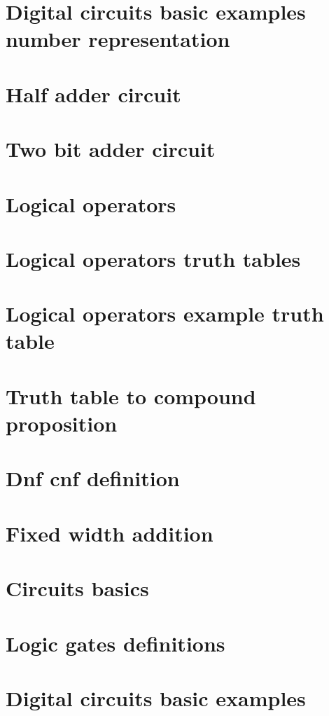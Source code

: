 
\section*{Digital circuits basic examples number representation}

\vfill
\section*{Half adder circuit}

\vfill
\section*{Two bit adder circuit}

\vfill
\section*{Logical operators}

\vfill
\section*{Logical operators truth tables}

\vfill
\section*{Logical operators example truth table}

\vfill
\section*{Truth table to compound proposition}

\vfill
\section*{Dnf cnf definition}

\vfill
\section*{Fixed width addition}

\vfill
\section*{Circuits basics}

\vfill
\section*{Logic gates definitions}

\vfill
\section*{Digital circuits basic examples}

\vfill
